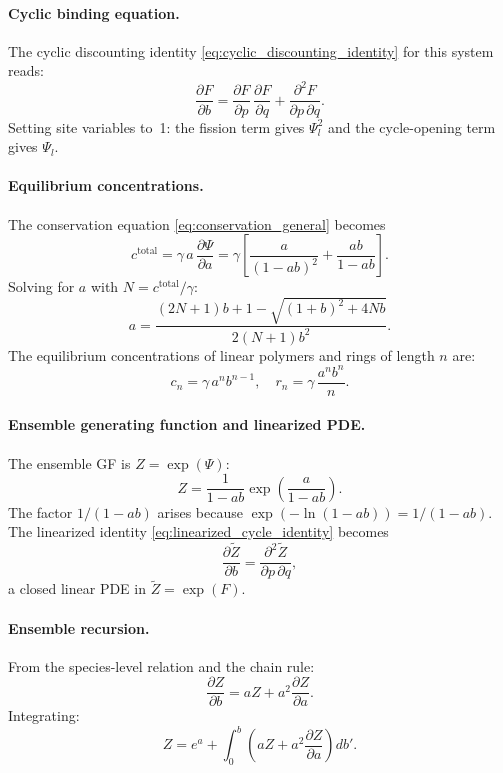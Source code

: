 \documentclass[11pt]{amsart}
\newcommand{\GFspecies}{F}
\newcommand{\GFensemble}{Z}
\newcommand{\GFcomb}{\Psi}
\newcommand{\PDeriv}[2]{\frac{\partial #1}{\partial #2}}
\theoremstyle{definition}
\theoremstyle{plain}
\theoremstyle{remark}
\begin{document}
\paragraph{Cyclic binding equation.}
The cyclic discounting identity \eqref{eq:cyclic_discounting_identity} for this system reads:
\[
\PDeriv{\GFspecies}{b} = \PDeriv{\GFspecies}{p}\,\PDeriv{\GFspecies}{q} + \frac{\partial^2 \GFspecies}{\partial p\,\partial q}.
\]
Setting site variables to~1: the fission term gives $\GFcomb_l^2$ and the cycle-opening term gives $\GFcomb_l$.

\paragraph{Equilibrium concentrations.}
The conservation equation \eqref{eq:conservation_general} becomes
\[
c^{\mathrm{total}} = \gamma\,a\,\PDeriv{\GFcomb}{a} = \gamma\left[\frac{a}{(1-ab)^2} + \frac{ab}{1-ab}\right].
\]
Solving for $a$ with $N = c^{\mathrm{total}}/\gamma$:
\[
a = \frac{(2N+1)b + 1 - \sqrt{(1+b)^2 + 4Nb}}{2(N+1)b^2}.
\]
The equilibrium concentrations of linear polymers and rings of length $n$ are:
\[
c_n = \gamma\,a^n b^{n-1}, \quad r_n = \gamma\,\frac{a^n b^n}{n}.
\]

\paragraph{Ensemble generating function and linearized PDE.}
The ensemble GF is $\GFensemble=\exp(\GFcomb)$:
\[
\GFensemble = \frac{1}{1-ab}\exp\!\left(\frac{a}{1-ab}\right).
\]
The factor $1/(1-ab)$ arises because $\exp(-\ln(1-ab)) = 1/(1-ab)$.
The linearized identity \eqref{eq:linearized_cycle_identity} becomes
\begin{equation}\label{eq:rings_linearized}
\PDeriv{\widetilde{\GFensemble}}{b} = \frac{\partial^2 \widetilde{\GFensemble}}{\partial p\,\partial q},
\end{equation}
a closed linear PDE in $\widetilde{\GFensemble} = \exp(\GFspecies)$.

\paragraph{Ensemble recursion.}
From the species-level relation and the chain rule:
\[
\PDeriv{\GFensemble}{b} = a\GFensemble + a^2\PDeriv{\GFensemble}{a}.
\]
Integrating:
\begin{equation}\label{eq:rings_ensemble_recursion}
\GFensemble = e^{a} + \int_0^b \left(a\GFensemble + a^2\PDeriv{\GFensemble}{a}\right)db'.
\end{equation}
\end{document}
